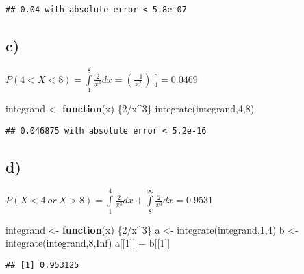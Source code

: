 \documentclass[
]{article}
\newenvironment{Shaded}{\begin{snugshade}}{\end{snugshade}}
\newcommand{\ConstantTok}[1]{\textcolor[rgb]{0.00,0.00,0.00}{#1}}
\newcommand{\ControlFlowTok}[1]{\textcolor[rgb]{0.13,0.29,0.53}{\textbf{#1}}}
\newcommand{\DecValTok}[1]{\textcolor[rgb]{0.00,0.00,0.81}{#1}}
\newcommand{\FunctionTok}[1]{\textcolor[rgb]{0.00,0.00,0.00}{#1}}
\newcommand{\NormalTok}[1]{#1}
\newcommand{\OtherTok}[1]{\textcolor[rgb]{0.56,0.35,0.01}{#1}}
\newcommand{\SpecialCharTok}[1]{\textcolor[rgb]{0.00,0.00,0.00}{#1}}
\begin{document}
\begin{verbatim}
## 0.04 with absolute error < 5.8e-07
\end{verbatim}

\hypertarget{c-1}{%
\subsection{c)}\label{c-1}}

\(P(4<X<8) = \int\limits_{4}^{8}\frac{2}{x^3}dx= \left( \frac{-1}{x^2}\right)|_{4}^{8} = 0.0469\)

\begin{Shaded}
\begin{Highlighting}[]
\NormalTok{integrand }\OtherTok{\textless{}{-}} \ControlFlowTok{function}\NormalTok{(x) \{}\DecValTok{2}\SpecialCharTok{/}\NormalTok{x}\SpecialCharTok{\^{}}\DecValTok{3}\NormalTok{\}}
\FunctionTok{integrate}\NormalTok{(integrand,}\DecValTok{4}\NormalTok{,}\DecValTok{8}\NormalTok{)}
\end{Highlighting}
\end{Shaded}

\begin{verbatim}
## 0.046875 with absolute error < 5.2e-16
\end{verbatim}

\hypertarget{d-1}{%
\subsection{d)}\label{d-1}}

\(P(X<4\:or\:X>8) = \int\limits_{1}^{4}\frac{2}{x^3}dx + \int\limits_{8}^{\infty}\frac{2}{x^3}dx = 0.9531\)

\begin{Shaded}
\begin{Highlighting}[]
\NormalTok{integrand }\OtherTok{\textless{}{-}} \ControlFlowTok{function}\NormalTok{(x) \{}\DecValTok{2}\SpecialCharTok{/}\NormalTok{x}\SpecialCharTok{\^{}}\DecValTok{3}\NormalTok{\}}
\NormalTok{a }\OtherTok{\textless{}{-}} \FunctionTok{integrate}\NormalTok{(integrand,}\DecValTok{1}\NormalTok{,}\DecValTok{4}\NormalTok{)}
\NormalTok{b }\OtherTok{\textless{}{-}} \FunctionTok{integrate}\NormalTok{(integrand,}\DecValTok{8}\NormalTok{,}\ConstantTok{Inf}\NormalTok{)}
\NormalTok{a[[}\DecValTok{1}\NormalTok{]] }\SpecialCharTok{+}\NormalTok{ b[[}\DecValTok{1}\NormalTok{]]}
\end{Highlighting}
\end{Shaded}

\begin{verbatim}
## [1] 0.953125
\end{verbatim}
\end{document}
